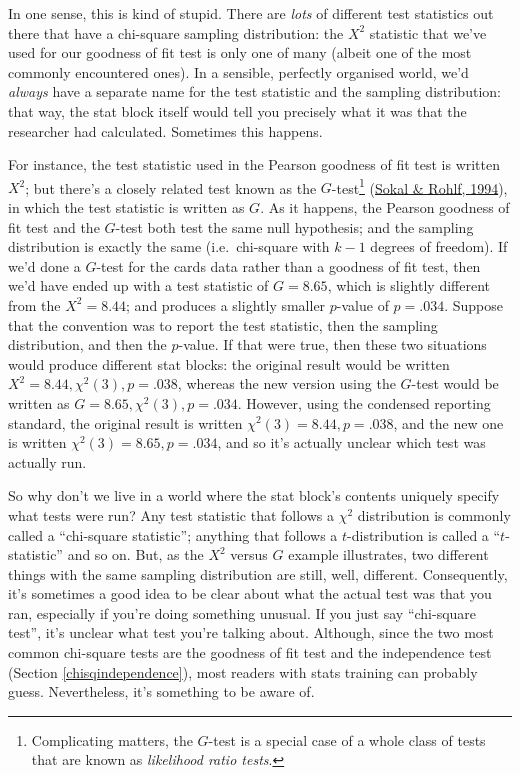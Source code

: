\documentclass[
]{book}
\theoremstyle{definition}
\theoremstyle{definition}
\theoremstyle{definition}
\theoremstyle{definition}
\theoremstyle{remark}
\begin{document}
In one sense, this is kind of stupid. There are \emph{lots} of different test statistics out there that have a chi-square sampling distribution: the \(X^2\) statistic that we've used for our goodness of fit test is only one of many (albeit one of the most commonly encountered ones). In a sensible, perfectly organised world, we'd \emph{always} have a separate name for the test statistic and the sampling distribution: that way, the stat block itself would tell you precisely what it was that the researcher had calculated. Sometimes this happens.

For instance, the test statistic used in the Pearson goodness of fit test is written \(X^2\); but there's a closely related test known as the \(G\)-test\footnote{Complicating matters, the \(G\)-test is a special case of a whole class of tests that are known as \emph{likelihood ratio tests}.} (\protect\hyperlink{ref-Sokal1994}{Sokal \& Rohlf, 1994}), in which the test statistic is written as \(G\). As it happens, the Pearson goodness of fit test and the \(G\)-test both test the same null hypothesis; and the sampling distribution is exactly the same (i.e.~chi-square with \(k-1\) degrees of freedom). If we'd done a \(G\)-test for the cards data rather than a goodness of fit test, then we'd have ended up with a test statistic of \(G = 8.65\), which is slightly different from the \(X^2 = 8.44\); and produces a slightly smaller \(p\)-value of \(p = .034\). Suppose that the convention was to report the test statistic, then the sampling distribution, and then the \(p\)-value. If that were true, then these two situations would produce different stat blocks: the original result would be written \(X^2 = 8.44, \chi^2(3), p = .038\), whereas the new version using the \(G\)-test would be written as \(G = 8.65, \chi^2(3), p = .034\). However, using the condensed reporting standard, the original result is written \(\chi^2(3) = 8.44, p = .038\), and the new one is written \(\chi^2(3) = 8.65, p = .034\), and so it's actually unclear which test was actually run.

So why don't we live in a world where the stat block's contents uniquely specify what tests were run? Any test statistic that follows a \(\chi^2\) distribution is commonly called a ``chi-square statistic''; anything that follows a \(t\)-distribution is called a ``\(t\)-statistic'' and so on. But, as the \(X^2\) versus \(G\) example illustrates, two different things with the same sampling distribution are still, well, different. Consequently, it's sometimes a good idea to be clear about what the actual test was that you ran, especially if you're doing something unusual. If you just say ``chi-square test'', it's unclear what test you're talking about. Although, since the two most common chi-square tests are the goodness of fit test and the independence test (Section \ref{chisqindependence}), most readers with stats training can probably guess. Nevertheless, it's something to be aware of.
\end{document}
